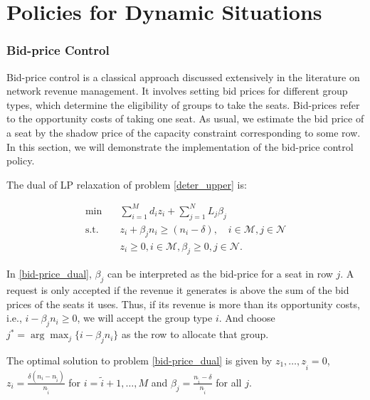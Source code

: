 
\section{Policies for Dynamic Situations}\label{policies}

\subsubsection*{Bid-price Control}
Bid-price control is a classical approach discussed extensively in the literature on network revenue management. It involves setting bid prices for different group types, which determine the eligibility of groups to take the seats. Bid-prices refer to the opportunity costs of taking one seat. As usual, we estimate the bid price of a seat by the shadow price of the capacity constraint corresponding to some row. In this section, we will demonstrate the implementation of the bid-price control policy. 

The dual of LP relaxation of problem \eqref{deter_upper} is:

\begin{equation}\label{bid-price_dual}
  \begin{aligned}
  \min \quad & \sum_{i=1}^{M} d_i z_i + \sum_{j= 1}^{N} L_j \beta_{j} \\
  \text {s.t.} \quad & z_{i} + \beta_j n_i \geq (n_i-\delta), \quad i \in \mathcal{M}, j \in \mathcal{N} \\
  & z_{i} \geq 0, i \in \mathcal{M}, \beta_{j} \geq 0, j \in \mathcal{N}.
  \end{aligned}
\end{equation}

In \eqref{bid-price_dual}, $\beta_{j}$ can be interpreted as the bid-price for a seat in row $j$. A request is only accepted if the revenue it generates is above the sum of the bid prices of the seats it uses. Thus, if its revenue is more than its opportunity costs, i.e., $i -\beta_{j} n_i \geq 0$, we will accept the group type $i$. And choose $j^{*} = \arg \max_{j} \{i -\beta_{j} n_i\}$ as the row to allocate that group.


\begin{lem}\label{bid-price}
 The optimal solution to problem \eqref{bid-price_dual} is given by $z_1 ,\ldots, z_{\tilde{i}} =0$, $z_{i} = \frac{\delta(n_i-n_{\tilde{i}})}{n_{\tilde{i}}}$ for $i = \tilde{i}+1, \ldots, M$ and $\beta_j = \frac{n_{\tilde{i}} - \delta}{n_{\tilde{i}}}$ for all $j$.
\end{lem}


